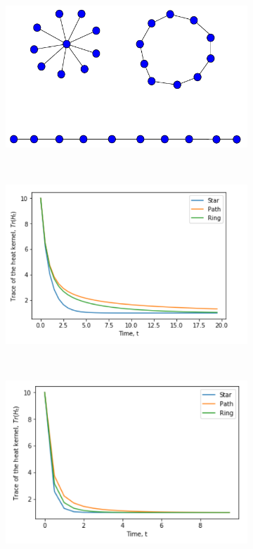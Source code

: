 \documentclass[10pt,a4paper]{article}
\begin{document}
\begin{enumerate}[1]
        	\begin{figure}[H]
        		\centering
        		\begin{subfigure}[b]{0.45\textwidth}
        			\includegraphics[width= \textwidth]{images/kernel-graphs.pdf}
        			\caption{}
        			\label{kernelgraphs}
        		\end{subfigure}~
        		\begin{subfigure}[b]{0.45\textwidth}
        			\includegraphics[width= \textwidth]{images/Trace-kernel-plot}
        			\caption{}
        			\label{plot-kernel}
        		\end{subfigure}\\
        		\begin{subfigure}[b]{0.45\textwidth}
        			\includegraphics[width= \textwidth]{images/mellin-s-2.png}

\end{subfigure}
\end{figure}
\end{enumerate}
\end{document}
